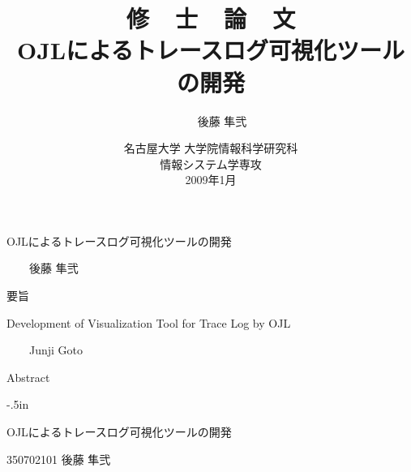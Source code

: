 \documentclass[a4paper,12pt]{jreport}
\title{
{\LARGE\sffamily\gtfamily
修\ \ 士\ \ 論\ \ 文\\
}
\vspace*{.6in}
{\huge\sffamily\gtfamily
OJLによるトレースログ可視化ツールの開発\\
}
\vfill\vfill\vfill
}
\author{
\LARGE\sffamily\gtfamily
350702101\ \ \ \ 後藤 隼弐\\
}
\date{
\vfill
\Large\sffamily\gtfamily
名古屋大学 大学院情報科学研究科\\[.2in]
情報システム学専攻\\[.2in]
2009年1月
\vfill
}
\begin{document}
\pagestyle{empty}
\vspace*{-1in}
\begin{center}
\Large\sffamily\gtfamily OJLによるトレースログ可視化ツールの開発
\end{center}
\begin{flushright}
\large\sffamily{}\ \ \ \ 後藤 隼弐
\end{flushright}
\begin{center}
\large\sffamily\gtfamily 要旨
\end{center}

\clearpage
\vspace*{-1in}
\begin{center}
\Large\sffamily
Development of Visualization Tool for Trace Log by OJL
\end{center}
\begin{flushright}
\large\sffamily{}\ \ \ \ Junji Goto
\end{flushright}
\begin{center}
\large\sffamily Abstract
\end{center}

\clearpage
\maketitle
\clearpage
\pagestyle{plain} 
\setcounter{page}{1}
\tableofcontents
\clearpage
\pagestyle{plain} 
\setcounter{page}{1}







\clearpage
\thispagestyle{empty}
\oddsidemargin -4in
\evensidemargin -4in
\topmargin -.5in
{
\tate
\Large\sffamily\gtfamily
\begin{minipage}{9.5in}
\begin{minipage}{6.0in}
OJLによるトレースログ可視化ツールの開発
\end{minipage}
\hfill\hfill\hfill\hfill
350702101
\hfill
後藤 隼弐
\end{minipage}
}
\end{document}
